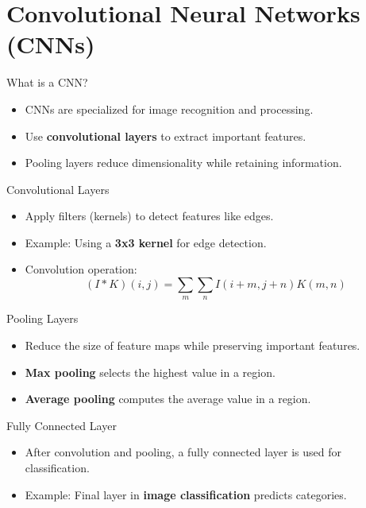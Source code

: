 \documentclass{beamer}
\begin{document}
\section{Convolutional Neural Networks (CNNs)}
\begin{frame}{What is a CNN?}
    \begin{itemize}
        \item CNNs are specialized for image recognition and processing.
        \item Use \textbf{convolutional layers} to extract important features.
        \item Pooling layers reduce dimensionality while retaining information.
    \end{itemize}
\end{frame}

\begin{frame}{Convolutional Layers}
    \begin{itemize}
        \item Apply filters (kernels) to detect features like edges.
        \item Example: Using a \textbf{3x3 kernel} for edge detection.
        \item Convolution operation:
        \[
        (I * K)(i, j) = \sum_m \sum_n I(i+m, j+n) K(m, n)
        \]
    \end{itemize}
\end{frame}

\begin{frame}{Pooling Layers}
    \begin{itemize}
        \item Reduce the size of feature maps while preserving important features.
        \item \textbf{Max pooling} selects the highest value in a region.
        \item \textbf{Average pooling} computes the average value in a region.
    \end{itemize}
\end{frame}

\begin{frame}{Fully Connected Layer}
    \begin{itemize}
        \item After convolution and pooling, a fully connected layer is used for classification.
        \item Example: Final layer in \textbf{image classification} predicts categories.
    \end{itemize}
\end{frame}
\end{document}
